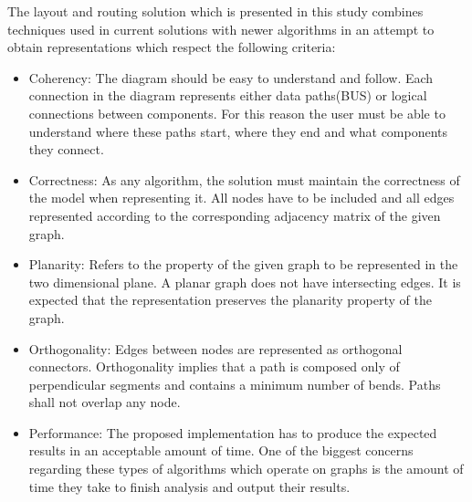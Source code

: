 The layout and routing solution which is presented in this study combines techniques used in current solutions with newer algorithms 
in an attempt to obtain representations which respect the following criteria:

\begin{itemize}

\item Coherency: The diagram should be easy to understand and follow. Each connection in the diagram represents either 
data paths(BUS) or logical connections between components. For this reason the user must be able to understand where these paths start, 
where they end and what components they connect.

\item Correctness: As any algorithm, the solution must maintain the correctness of the model when representing it. All nodes have to be
included and all edges represented according to the corresponding adjacency matrix of the given graph.

\item Planarity: Refers to the property of the given graph to be represented in the two dimensional plane. A planar graph does not have 
intersecting edges. It is expected that the representation preserves the planarity property of the graph.

\item Orthogonality: Edges between nodes are represented as orthogonal connectors. Orthogonality implies that a path is composed only
of perpendicular segments and contains a minimum number of bends. Paths shall not overlap any node.

\item Performance: The proposed implementation has to produce the expected results in an acceptable amount of time. One of the biggest 
concerns regarding these types of algorithms which operate on graphs is the amount of time they take to finish analysis and output 
their results.

\end{itemize}
